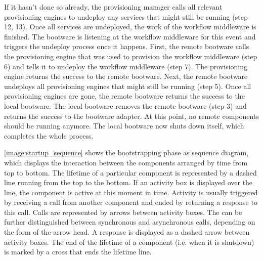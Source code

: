 If it hasn't done so already, the provisioning manager calls all relevant provisioning engines to undeploy any services that might still be running (step 12, 13).
Once all services are undeployed, the work of the workflow middleware is finished.
The bootware is listening at the workflow middleware for this event and triggers the undeploy process once it happens.
First, the remote bootware calls the provisioning engine that was used to provision the workflow middleware (step 6) and tells it to undeploy the workflow middleware (step 7).
The provisioning engine returns the success to the remote bootware.
Next, the remote bootware undeploys all provisioning engines that might still be running (step 5).
Once all provisioning engines are gone, the remote bootware returns the success to the local bootware.
The local bootware removes the remote bootware (step 3) and returns the success to the bootware adapter.
At this point, no remote components should be running anymore.
The local bootware now shuts down itself, which completes the whole process.

\autoref{image:startup_sequence} shows the bootstrapping phase as sequence diagram, which displays the interaction between the components arranged by time from top to bottom.
The lifetime of a particular component is represented by a dashed line running from the top to the bottom.
If an activity box is displayed over the line, the component is active at this moment in time.
Activity is usually triggered by receiving a call from another component and ended by returning a response to this call.
Calls are represented by arrows between activity boxes.
The can be further distinguished between synchronous and asynchronous calls, depending on the form of the arrow head.
A response is displayed as a dashed arrow between activity boxes.
The end of the lifetime of a component (i.e. when it is shutdown) is marked by a cross that ends the lifetime line.

